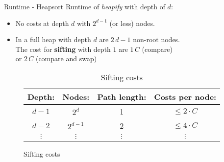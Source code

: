 
\begin{frame}{Runtime - Heapsort}
  Runtime of \textit{heapify} with depth of $d$:
  \begin{itemize}
    \item
      No costs at depth $d$ with $2^{d - 1}$ (or less) nodes.
    \item
      In a full heap with depth $d$ are $2 \, d - 1$ non-root nodes.\\
      The cost for \textbf{sifting} with depth $1$ are $1 \, C$
      ({\color{Mittel-Blau}compare})\\
      or $2 \, C$ ({\color{Mittel-Blau}compare} and {\color{Mittel-Blau}swap})
  \end{itemize}%
  \begin{figure}[!h]%
    \begin{table}%
      \begin{center}%
        \begin{tabular}{c|c|c|c}
          Depth:     & Nodes:    & Path length: & Costs per node:\\
          \hline
          $d - 1$    & $2^d$     & 1            & $\leq 2 \cdot C$\\
          $d - 2$    & $2^{d-1}$ & 2            & $\leq 4 \cdot C$\\
          $\vdots$   & $\vdots$  & $\vdots$     & $\vdots$ 
        \end{tabular}%
        \caption{Sifting costs}%
        \label{tab:sifting_costs}%
      \end{center}%
    \end{table}%
  \end{figure}
\end{frame}


